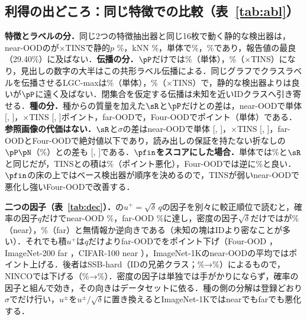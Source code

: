 \subsection{利得の出どころ：同じ特徴での比較（表~\ref{tab:abl}）}
\label{sec:abl}
\textbf{特徴とラベルの分．}同じ2つの特徴抽出器と同じ16枚で動く静的な検出器は，near-OODの\FPR{}が$\times$TINSで静的$p$ \NAblXfitStaticPooledTinsNearFpr\%，kNN \NAblKnnTinsNearFpr\%，単体で\NAblXfitStaticPooledNoneNearFpr\%，\NAblKnnNoneNearFpr\%であり，報告値の最良（29.40\%）に及ばない．\textbf{伝播の分．}$\pP$だけで\FPR{}は\NRLpAloneNearFpr\%（単体），\NRLpTinsNearFpr\%（$\times$TINS）になり，見出しの数字の大半はこの共形ラベル伝播による．同じグラフでクラスラベルを伝播させるLGC-maxは\NAblLgcmaxNoneNearFpr\%（単体），\NAblLgcmaxTinsNearFpr\%（$\times$TINS）で，静的な検出器よりは良いが$\pP$に遠く及ばない．閉集合を仮定する伝播は未知を近いIDクラスへ引き寄せる．\textbf{種の分．}種からの質量を加えた$\sR$と$\pP$だけとの差は，near-OODで単体\NRvsLpAloneNearD{} [\NRvsLpAloneNearDLo, \NRvsLpAloneNearDHi]，$\times$TINS \NRvsLpTinsNearD{} [\NRvsLpTinsNearDLo, \NRvsLpTinsNearDHi]ポイント，far-OODで\NRvsLpAloneFarD{}，Four-OODで\NRvsLpAloneFourD{}ポイント（単体）である．\textbf{参照画像の代価はない．}$\sR$と$\sigma$の差はnear-OODで単体\NRAloneNearDSig{} [\NRAloneNearDSigLo, \NRAloneNearDSigHi]，$\times$TINS \NRTinsNearDSig{} [\NRTinsNearDSigLo, \NRTinsNearDSigHi]，far-OODとFour-OODで絶対値\NRDSigFarFourMaxAbs{}以下であり，読み出しの保証を持たない折なしの$\pP\pN$（\NRVOneAloneNearFpr\%）との差も\NRvsVOneAloneNearD{} [\NRvsVOneAloneNearDLo, \NRvsVOneAloneNearDHi]である．\textbf{$\pfin$をスコアにした場合．}単体では\NRPfAloneNearFpr\%と$\sR$と同じだが，TINSとの積は\NRPfTinsNearFpr\%（\NRPfTinsNearWorse{}ポイント悪化），Four-OODでは逆に\NRPfTinsFourFpr\%と良い．$\pfin$の床の上ではベース検出器が順序を決めるので，TINSが弱いnear-OODで悪化し強いFour-OODで改善する．

\textbf{二つの因子（表~\ref{tab:dec}）．}の$u^{+}=\sqrt{\delta}\,q$の因子を別々に較正順位で読むと，確率の因子$q$だけでnear-OOD \NRDecQINNearFpr\%，far-OOD \NRDecQINFarFpr\%に達し，密度の因子$\sqrt{\delta}$だけでは\AUC{}が\NRDecDegINNearAuroc\%（near），\NRDecDegINFarAuroc\%（far）と無情報か逆向きである（未知の塊はIDより密なことが多い）．それでも積$u^{+}$は$q$だけよりfar-OODで\FPR{}を\NRDecUHelpsINFar{}ポイント下げ（Four-OOD \NRDecUHelpsFour{}，ImageNet-200 far \NRDecUHelpsITFar{}，CIFAR-100 near \NRDecUHelpsCFNear{}），ImageNet-1Kのnear-OODの平均では\NRDecUHurtsINNear{}ポイント上げる．後者はSSB-hard（IDの兄弟クラス；\NRDecQSsbHardFpr\%→\NRDecUSsbHardFpr\%）によるもので，NINCOでは下げる（\NRDecQNincoFpr\%→\NRDecUNincoFpr\%）．密度の因子は単独では手がかりにならず，確率の因子と組んで効き，その向きはデータセットに依る．種の側の分解は登録どおり$\sigma$でだけ行い，$u^{\pm}$を$u^{\pm}/\sqrt{\delta}$に置き換えるとImageNet-1Kではnearでもfarでも悪化する．

